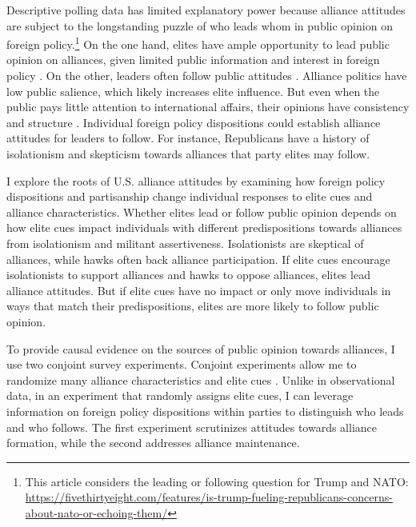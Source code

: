 \documentclass[12pt]{article}
\begin{document}
Descriptive polling data has limited explanatory power because alliance attitudes are subject to the longstanding puzzle of who leads whom in public opinion on foreign policy.\footnote{This article considers the leading or following question for Trump and NATO: \url{https://fivethirtyeight.com/features/is-trump-fueling-republicans-concerns-about-nato-or-echoing-them/}}
On the one hand, elites have ample opportunity to lead public opinion on alliances, given limited public information and interest in foreign policy \citep{Canes-Wrone2006, BaumPotter2008, Druckman2014}.
On the other, leaders often follow public attitudes \citep{Barberaetal2019, HagerHilbig2020}.
Alliance politics have low public salience, which likely increases elite influence. 
But even when the public pays little attention to international affairs, their opinions have consistency and structure \citep{Holsti1992, PageShapiro1992}.
Individual foreign policy dispositions \citep{KertzerZeitzoff2017} could establish alliance attitudes for leaders to follow.
For instance, Republicans have a history of isolationism and skepticism towards alliances that party elites may follow. 


I explore the roots of U.S. alliance attitudes by examining how foreign policy dispositions and partisanship change individual responses to elite cues and alliance characteristics.
Whether elites lead or follow public opinion depends on how elite cues impact individuals with different predispositions towards alliances from isolationism and militant assertiveness.  
Isolationists are skeptical of alliances, while hawks often back alliance participation. 
If elite cues encourage isolationists to support alliances and hawks to oppose alliances, elites lead alliance attitudes. 
But if elite cues have no impact or only move individuals in ways that match their predispositions, elites are more likely to follow public opinion.


To provide causal evidence on the sources of public opinion towards alliances, I use two conjoint survey experiments.
Conjoint experiments allow me to randomize many alliance characteristics and elite cues \citep{Hainmuelleretal2014}.
Unlike in observational data, in an experiment that randomly assigns elite cues, I can leverage information on foreign policy dispositions within parties to distinguish who leads and who follows. 
The first experiment scrutinizes attitudes towards alliance formation, while the second addresses alliance maintenance. 
\end{document}
